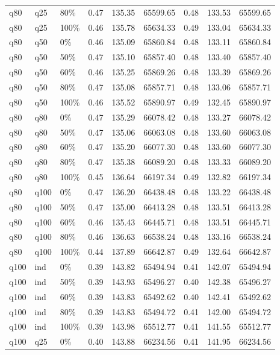 \begin{longtable}{lllrrrrrr}
  q80 & q25 & 80\% & 0.47 & 135.35 & 65599.65 & 0.48 & 133.53 & 65599.65 \\ 
  q80 & q25 & 100\% & 0.46 & 135.78 & 65634.33 & 0.49 & 133.04 & 65634.33 \\ 
  q80 & q50 & 0\% & 0.46 & 135.09 & 65860.84 & 0.48 & 133.11 & 65860.84 \\ 
  q80 & q50 & 50\% & 0.47 & 135.10 & 65857.40 & 0.48 & 133.40 & 65857.40 \\ 
  q80 & q50 & 60\% & 0.46 & 135.25 & 65869.26 & 0.48 & 133.39 & 65869.26 \\ 
  q80 & q50 & 80\% & 0.47 & 135.08 & 65857.71 & 0.48 & 133.06 & 65857.71 \\ 
  q80 & q50 & 100\% & 0.46 & 135.52 & 65890.97 & 0.49 & 132.45 & 65890.97 \\ 
  q80 & q80 & 0\% & 0.47 & 135.29 & 66078.42 & 0.48 & 133.27 & 66078.42 \\ 
  q80 & q80 & 50\% & 0.47 & 135.06 & 66063.08 & 0.48 & 133.60 & 66063.08 \\ 
  q80 & q80 & 60\% & 0.47 & 135.20 & 66077.30 & 0.48 & 133.60 & 66077.30 \\ 
  q80 & q80 & 80\% & 0.47 & 135.38 & 66089.20 & 0.48 & 133.33 & 66089.20 \\ 
  q80 & q80 & 100\% & 0.45 & 136.64 & 66197.34 & 0.49 & 132.82 & 66197.34 \\ 
  q80 & q100 & 0\% & 0.47 & 136.20 & 66438.48 & 0.48 & 133.22 & 66438.48 \\ 
  q80 & q100 & 50\% & 0.47 & 135.00 & 66413.28 & 0.48 & 133.51 & 66413.28 \\ 
  q80 & q100 & 60\% & 0.46 & 135.43 & 66445.71 & 0.48 & 133.51 & 66445.71 \\ 
  q80 & q100 & 80\% & 0.46 & 136.63 & 66538.24 & 0.48 & 133.16 & 66538.24 \\ 
  q80 & q100 & 100\% & 0.44 & 137.89 & 66642.87 & 0.49 & 132.64 & 66642.87 \\ 
  q100 & ind & 0\% & 0.39 & 143.82 & 65494.94 & 0.41 & 142.07 & 65494.94 \\ 
  q100 & ind & 50\% & 0.39 & 143.93 & 65496.27 & 0.40 & 142.38 & 65496.27 \\ 
  q100 & ind & 60\% & 0.39 & 143.83 & 65492.62 & 0.40 & 142.41 & 65492.62 \\ 
  q100 & ind & 80\% & 0.39 & 143.83 & 65494.72 & 0.41 & 142.00 & 65494.72 \\ 
  q100 & ind & 100\% & 0.39 & 143.98 & 65512.77 & 0.41 & 141.55 & 65512.77 \\ 
  q100 & q25 & 0\% & 0.40 & 143.88 & 66234.56 & 0.41 & 141.95 & 66234.56 \\ 

\end{longtable}
